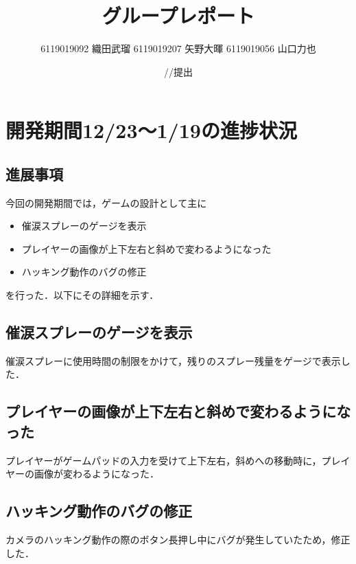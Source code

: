 \documentclass{jarticle}
\title{グループレポート}
\author{6119019092 織田武瑠 6119019207 矢野大暉 6119019056 山口力也}
\date{\number\year/\number\month/\number\day 提出}
\newcommand{\xa}{催涙スプレーのゲージを表示}
\newcommand{\xb}{プレイヤーの画像が上下左右と斜めで変わるようになった}
\newcommand{\xc}{ハッキング動作のバグの修正}
\newcommand{\pitem}[3]{
\item #1
\item #2
\item #3
}
\begin{document}
\maketitle

\section{開発期間12/23～1/19の進捗状況} 

\subsection{進展事項}
今回の開発期間では，ゲームの設計として主に
\begin{itemize}
\pitem{\xa}{\xb}{\xc}
\end{itemize}
を行った．以下にその詳細を示す．

\subsection{\xa}
催涙スプレーに使用時間の制限をかけて，残りのスプレー残量をゲージで表示した．

\subsection{\xb}
プレイヤーがゲームパッドの入力を受けて上下左右，斜めへの移動時に，プレイヤーの画像が変わるようになった．

\subsection{\xc}
カメラのハッキング動作の際のボタン長押し中にバグが発生していたため，修正した．
\end{document}

